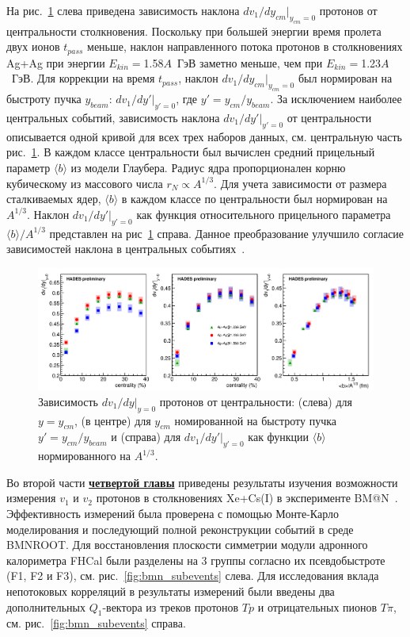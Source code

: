 На рис.~\ref{fig:hades_dv1dy_many_plot} слева приведена зависимость наклона $dv_1/dy_{cm}|_{y_{cm}=0}$ протонов от центральности столкновения.
Поскольку при большей энергии время пролета двух ионов $t_{pass}$ меньше, наклон направленного потока протонов в столкновениях Ag+Ag при энергии $E_{kin}=$1.58$A$~ГэВ заметно меньше, чем при $E_{kin}=$1.23$A$~ГэВ. 
Для коррекции на время $t_{pass}$, наклон  $dv_1/dy_{cm}|_{y_{cm}=0}$ был нормирован на быстроту пучка $y_{beam}$: $dv_1/dy'|_{y'=0}$, где $y'=y_{cm}/y_{beam}$.
За исключением наиболее центральных событий, зависимость наклона $dv_1/dy'|_{y'=0}$ от центральности описывается одной кривой для всех трех наборов данных, см. центральную часть рис.~\ref{fig:hades_dv1dy_many_plot}.
В каждом классе центральности был вычислен средний прицельный параметр $\langle b \rangle$ из модели Глаубера.
Радиус ядра пропорционален корню кубическому из массового числа $r_N \propto A^{1/3}$.
Для учета зависимости от размера сталкиваемых ядер,  $\langle b \rangle$ в каждом классе по центральности был нормирован на $A^{1/3}$.
Наклон $dv_1/dy'|_{y'=0}$ как функция относительного прицельного параметра $\langle b \rangle / A^{1/3}$ представлен на рис~\ref{fig:hades_dv1dy_many_plot} справа.
Данное преобразование улучшило согласие зависимостей наклона в центральных событиях~\cite{Mamaev:2024-1,Mamaev:2024-2}. 
%
\begin{figure}[h]
\begin{center}
\includegraphics[width=0.9\linewidth]{images/dv1dy_many_plot.png}
\caption{Зависимость $dv_1/dy|_{y=0}$ протонов от центральности: (слева) для $y=y_{cm}$, (в центре) для $y_{cm}$ номированной 
на быстроту пучка $y' = y_{cm}/y_{beam}$ и (справа) для $dv_1/dy'|_{y'=0}$ как функции $\langle b \rangle$ нормированного на  $A^{1/3}$.}
\label{fig:hades_dv1dy_many_plot}
\end{center}
\end{figure}


Во второй части \underline{\textbf{четвертой главы}} приведены результаты изучения возможности измерения $v_1$ и $v_2$ протонов в столкновениях Xe+Cs(I)   в эксперименте  BM@N~\cite{Mamaev:2024,Mamaev:2023yhz,Mamaev:2023fpr}.
Эффективность  измерений была проверена  с помощью Монте-Карло моделирования   и последующий полной реконструкции событий в среде BMNROOT. 
Для восстановления плоскости симметрии модули адронного калориметра FHCal были разделены на 3 группы согласно их псевдобыстроте (F1, F2 и F3), см. рис.~\ref{fig:bmn_subevents} слева. 
Для исследования вклада непотоковых корреляций в результаты измерений были введены два дополнительных  $Q_1$-вектора из треков протонов $Tp$ и отрицательных пионов $T\pi$, см.  рис.~\ref{fig:bmn_subevents} справа.

